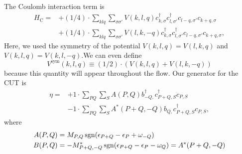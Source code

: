 The Coulomb interaction term is
\begin{align*}
	H_\mathrm{C} = 	&+(1/4) \cdot \sum_{ k l q } \sum_{ \sigma \sigma' } V( k, l, q )   c_{ k, \sigma }^\dagger  c_{ l, \sigma' }^\dagger  c_{ l-q, \sigma' } c_{ k+q, \sigma }  \\
	&+(1/4) \cdot \sum_{ k l q } \sum_{ \sigma \sigma' } V( l, k, -q )   c_{ k, \sigma }^\dagger  c_{ l, \sigma' }^\dagger  c_{ l-q, \sigma' } c_{ k+q, \sigma } 
,
\end{align*}
Here, we used the symmetry of the potential $V(k, l, q) = V(l, k, q)$ and $V(k, l, q) = V(k, l, -q)$.We can even define
\begin{equation}
	V^\mathrm{sym} (k, l, q) \equiv (1/2) \cdot (V(k, l, q) + V(l, k, -q))
\end{equation}
because this quantity will appear throughout the flow.
Our generator for the CUT is 
\begin{align*}
	\eta = 	&+1 \cdot \sum_{ P Q } \sum_{ S } A( P, Q )   b_{ -Q, }^\dagger  c_{ P+Q, S }^\dagger  c_{ P, S }  \\
	&-1 \cdot \sum_{ P Q } \sum_{ S } A^*( P+Q, -Q )   b_{ Q, } c_{ P+Q, S }^\dagger  c_{ P, S } 
, \end{align*}
where
\begin{align}
	A(P,Q) &= M_{P,Q} \operatorname{sgn} ( \epsilon_{P+Q} - \epsilon_P + \omega_{-Q} ) \\
	B(P,Q) &= -M_{P+Q,-Q}^* \operatorname{sgn} ( \epsilon_{P+Q} - \epsilon_P - \omega_Q ) = A^* (P+Q, -Q)
\end{align}

